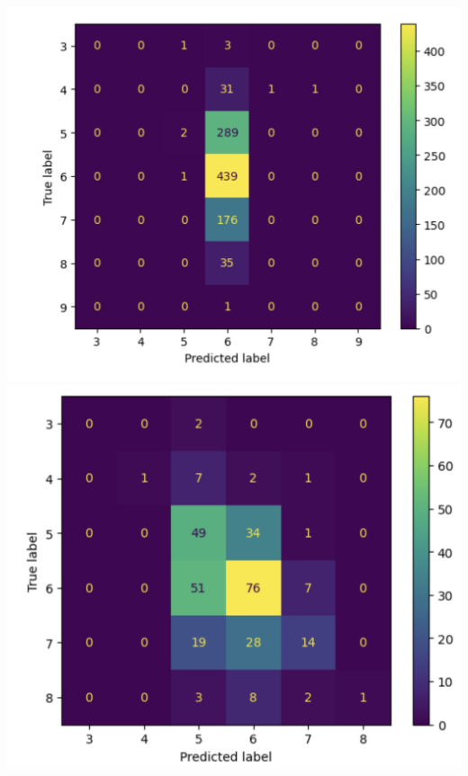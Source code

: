 \documentclass[titlepage]{article}
\begin{document}
\begin{center}
	\includegraphics[width=.42\textwidth]{img/garbage.png}
	\includegraphics[width=.4\textwidth]{img/knngarbage.png}
\end{center}
\end{document}
